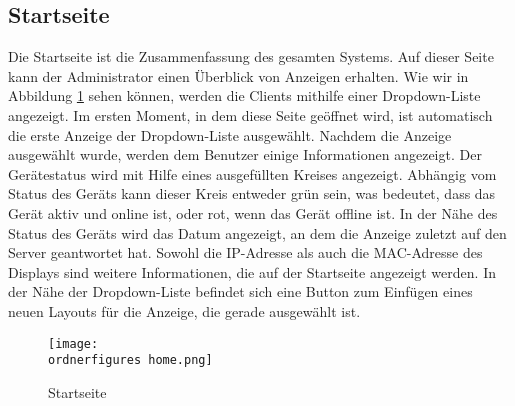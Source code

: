 

\subsection{Startseite}

Die Startseite ist die Zusammenfassung des gesamten Systems. Auf dieser Seite kann der Administrator einen Überblick von Anzeigen erhalten. Wie wir in Abbildung \ref{fi:home} sehen können, werden die Clients mithilfe einer Dropdown-Liste angezeigt. Im ersten Moment, in dem diese Seite geöffnet wird, ist automatisch die erste Anzeige der Dropdown-Liste ausgewählt. Nachdem die Anzeige ausgewählt wurde, werden dem Benutzer einige Informationen angezeigt.
Der Gerätestatus wird mit Hilfe eines ausgefüllten Kreises angezeigt. Abhängig vom Status des Geräts kann dieser Kreis entweder grün sein, was bedeutet, dass das Gerät aktiv und online ist, oder rot, wenn das Gerät offline ist. In der Nähe des Status des Geräts wird das Datum angezeigt, an dem die Anzeige zuletzt auf den Server geantwortet hat.
Sowohl die IP-Adresse als auch die MAC-Adresse des Displays sind weitere Informationen, die auf der Startseite angezeigt werden.
In der Nähe der Dropdown-Liste befindet sich eine Button zum Einfügen eines neuen Layouts für die Anzeige, die gerade ausgewählt ist.


\begin{figure}[H]
	\centering
	\texttt{[image: \\ordnerfigures home.png]}
	\caption{Startseite}
	\label{fi:home}
\end{figure}


